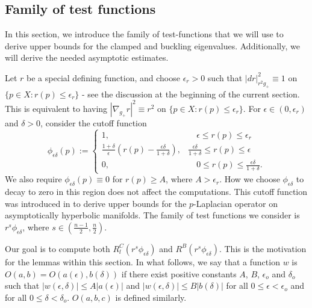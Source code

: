 \documentclass{amsart}
\newcommand{\D}{\delta}
\newcommand{\E}{\epsilon}
\begin{document}
\subsection{Family of test functions}

In this section, we introduce the family of test-functions that we will use to derive upper bounds for the clamped and buckling eigenvalues. Additionally, we will derive the needed asymptotic estimates. 

Let $r$ be a special defining function, and choose $\epsilon_r>0$ such that $|dr|^2_{r^2g_+}\equiv 1$ on $\{p\in X: r(p)\le \epsilon_r\}$ - see the discussion at the beginning of the current section. This is equivalent to having $|\nabla_{g_+}r|^2\equiv r^2$ on $\{p\in X: r(p)\le \epsilon_r\}$. For $\epsilon\in (0,\epsilon_r)$ and $\delta>0$, consider the cutoff function 
    \begin{equation}\label{CutOff-Function}
\phi_{\epsilon\delta}(p):=\begin{cases} 
      1, & \quad\epsilon\leq r(p) \le \E_r \\
      \frac{1+\delta}{\epsilon}(r(p)-\frac{\epsilon\delta}{1+\delta}), & \frac{\epsilon\delta}{1+\delta}\leq r(p)\leq \epsilon \\
      0, & \quad 0\leq r(p)\leq   \frac{\epsilon\delta}{1+\delta}.
   \end{cases}
\end{equation}
We also require $\phi_{\E\D}(p) \equiv 0$ for $r(p)\ge A$, where $A>\epsilon_r$. How we choose $\phi_{\E\D}$ to decay to zero in this region does not affect the computations. This cutoff function was introduced in \cite{PerezAyalaTyrrell} to derive upper bounds for the $p$-Laplacian operator on asymptotically hyperbolic manifolds. The family of test functions we consider is $r^{s}\phi_{\E\D}$, where $s\in (\frac{n-1}{2},\frac{n}{2})$. 

Our goal is to compute both $R^C_l(r^s\phi_{\E\D})$ and $R^B(r^s\phi_{\E\D})$. This is the motivation for the lemmas within this section. In what follows, we say that a function $w$ is $O(a,b) = O(a(\epsilon), b(\delta))$ if there exist positive constants $A$, $B$, $\epsilon_o$ and $\delta_o$ such that $|w(\epsilon,\delta)|\le A|a(\epsilon)|$ and $|w(\epsilon,\delta)|\le B|b(\delta)|$ for all $0\le \epsilon<\epsilon_o$ and for all $0\le \delta<\delta_o$. $O(a,b,c)$ is defined similarly.
\end{document}
